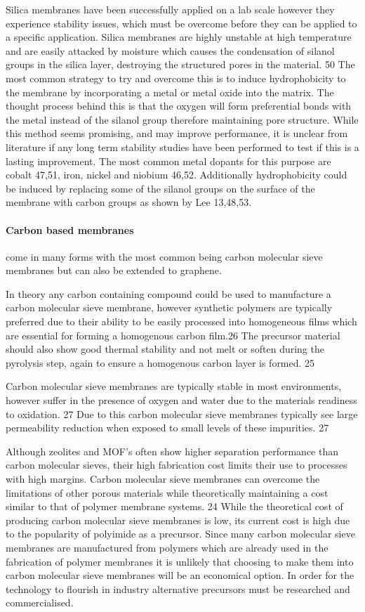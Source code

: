Silica membranes have been successfully applied on a lab scale however they experience 
stability issues, which must be overcome before they can be applied to a specific application. 
Silica membranes are highly unstable at high temperature and are easily attacked by moisture 
which causes the condensation of silanol groups in the silica layer, destroying the structured 
pores in the material. 50 The most common strategy to try and overcome this is to induce 
hydrophobicity to the membrane by incorporating a metal or metal oxide into the matrix.  
The thought process behind this is that the oxygen will form preferential bonds with the 
metal instead of the silanol group therefore maintaining pore structure. While this method 
seems promising, and may improve performance, it is unclear from literature if any long term 
stability studies have been performed to test if this is a lasting improvement. The most 
common metal dopants for this purpose are cobalt 47,51, iron, nickel and niobium 46,52. 
Additionally hydrophobicity could be induced by replacing some of the silanol groups on the 
surface of the membrane with carbon groups as shown by Lee 13,48,53. 

\paragraph{Carbon based membranes} come in many forms with the most common being carbon 
molecular sieve membranes but can also be extended to graphene. 

In theory any carbon containing compound could be used to manufacture a carbon molecular 
sieve membrane, however synthetic polymers are typically preferred due to their ability to 
be easily processed into homogeneous films which are essential for forming a homogenous 
carbon film.26  The precursor material should also show good thermal stability and not melt 
or soften during the pyrolysis step, again to ensure a homogenous carbon layer is formed. 25

Carbon molecular sieve membranes are typically stable in most environments, however suffer 
in the presence of oxygen and water due to the materials readiness to oxidation. 27 Due to 
this carbon molecular sieve membranes typically see large permeability reduction when exposed 
to small levels of these impurities. 27

Although zeolites and MOF’s often show higher separation performance than carbon molecular 
sieves, their high fabrication cost limits their use to processes with high margins. 
Carbon molecular sieve membranes can overcome the limitations of other porous materials 
while theoretically maintaining a cost similar to that of polymer membrane systems. 24 
While the theoretical cost of producing carbon molecular sieve membranes is low, its current 
cost is high due to the popularity of polyimide as a precursor. Since many carbon molecular 
sieve membranes are manufactured from polymers which are already used in the fabrication of 
polymer membranes it is unlikely that choosing to make them into carbon molecular sieve 
membranes will be an economical option. In order for the technology to flourish in industry 
alternative precursors must be researched and commercialised. 

